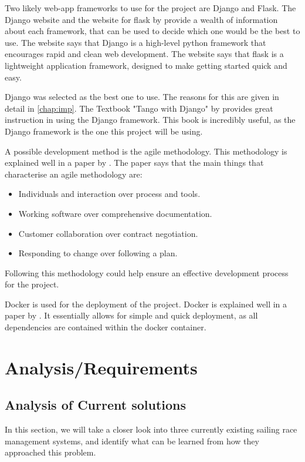 \documentclass{l4proj}
\begin{document}
Two likely web-app frameworks to use for the project are Django and Flask. The Django website \citep{django} and the website for flask by \citet{flask} provide a wealth of information about each framework, that can be used to decide which one would be the best to use. The \citet{django} website says that Django is a high-level python framework that encourages rapid and clean web development. The \citet{flask} website says that flask is a lightweight application framework, designed to make getting started quick and easy.

Django was selected as the best one to use. The reasons for this are given in detail in \ref{chap:imp}. The Textbook "Tango with Django" by \citet{tango} provides great instruction in using the Django framework. This book is incredibly useful, as the Django framework is the one this project will be using.

A possible development method is the agile methodology. This methodology is explained well in a paper by \citet{agile}. The paper says that the main things that characterise an agile methodology are:
\begin{itemize}
    \item 
    Individuals and interaction over process and tools.
    \item 
    Working software over comprehensive documentation.
    \item 
    Customer collaboration over contract negotiation.
    \item 
    Responding to change over following a plan.
\end{itemize}

Following this methodology could help ensure an effective development process for the project.

Docker is used for the deployment of the project. Docker is explained well in a paper by \citet{docker}. It essentially allows for simple and quick deployment, as all dependencies are contained within the docker container.




\chapter{Analysis/Requirements}\label{chap:A/R}
\section{Analysis of Current solutions}
In this section, we will take a closer look into three currently existing sailing race management systems, and identify what can be learned from how they approached this problem.
\end{document}
